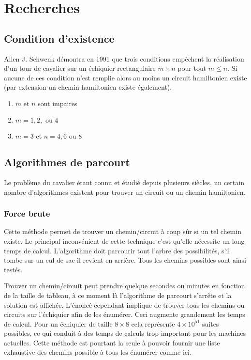 \section{Recherches}
\subsection{Condition d'existence}
Allen J. Schwenk démontra en 1991 que trois conditions empêchent la réalisation d'un tour de cavalier sur un échiquier rectangulaire $m \times n$  pour tout $m \leq n$. Si aucune de ces condition n'est remplie alors au moins un circuit hamiltonien existe (par extension un chemin hamiltonien existe également).
\begin{enumerate}
\item $m$ et $n$ sont impaires
\item $m = 1,2,$ ou $4$
\item $m = 3$ et $n = 4,6$ ou $8$
\end{enumerate}

\subsection{Algorithmes de parcourt}
Le problème du cavalier étant connu et étudié depuis plusieurs siècles, un certain nombre d'algorithmes existent pour trouver un circuit ou un chemin hamiltonien.

\subsubsection{Force brute}
Cette méthode permet de trouver un chemin/circuit à coup sûr si un tel chemin existe. Le principal inconvénient de cette technique c'est qu'elle nécessite un long temps de calcul. L'algorithme doit parcourir tout l'arbre des possibilités, s’il tombe sur un cul de sac il revient en arrière. Tous les chemins possibles sont ainsi testés.

Trouver un chemin/circuit peut prendre quelque secondes ou minutes en fonction de la taille de tableau, à ce moment là l'algorithme de parcourt s'arrête et la solution est affichée. L'énoncé cependant implique de trouver tous les chemins ou circuits sur l'échiquier afin de les énumérer. Ceci augmente grandement les temps de calcul.  Pour un échiquier de taille $8 \times 8$ cela représente $ 4 \times 10^{51}$ suites possibles, ce qui conduit à des temps de calculs trop important pour les machines actuelles. 
Cette méthode est pourtant la seule à pouvoir fournir une liste exhaustive des chemins possible à tous les énumérer comme ici.

